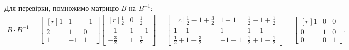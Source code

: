 Для перевірки, помножимо матрицю \(B\) на \(B^{-1}\):
\begin{gather*}
	B\cdot B^{-1}=\begin{bmatrix*}[r]
		1&1&-1\\
		2&1&0\\
		1&-1&1
	\end{bmatrix*}\begin{bmatrix*}[r]
	\frac{1}{2}&0&\frac{1}{2}\\
	-1&1&-1\\
	-\frac{3}{2}&1&\frac{1}{2}
\end{bmatrix*}=\begin{bmatrix*}[c]
\frac{1}{2}-1+\frac{3}{2}&1-1&\frac{1}{2}-1+\frac{1}{2}\\
1-1&1&1-1\\
\frac{1}{2}+1-\frac{3}{2}&-1+1&\frac{1}{2}+1-\frac{1}{2}
\end{bmatrix*}=\begin{bmatrix*}[r]
1&0&0\\
0&1&0\\
0&0&1
\end{bmatrix*}.
\end{gather*}

